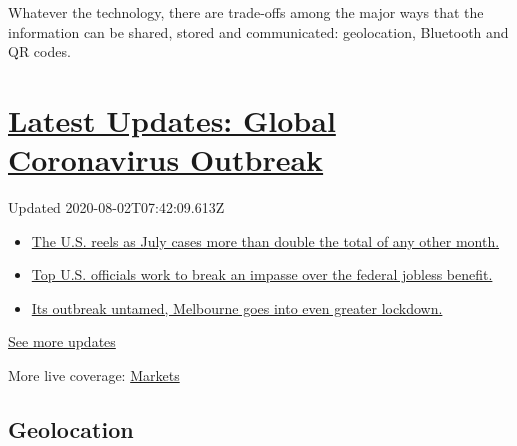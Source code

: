 Whatever the technology, there are trade-offs among the major ways that
the information can be shared, stored and communicated: geolocation,
Bluetooth and QR codes.

\hypertarget{latest-updates-global-coronavirus-outbreak}{%
\section{\texorpdfstring{\href{https://www.nytimes3xbfgragh.onion/2020/08/01/world/coronavirus-covid-19.html?action=click\&pgtype=Article\&state=default\&region=MAIN_CONTENT_1\&context=storylines_live_updates}{Latest
Updates: Global Coronavirus
Outbreak}}{Latest Updates: Global Coronavirus Outbreak}}\label{latest-updates-global-coronavirus-outbreak}}

Updated 2020-08-02T07:42:09.613Z

\begin{itemize}
\tightlist
\item
  \href{https://www.nytimes3xbfgragh.onion/2020/08/01/world/coronavirus-covid-19.html?action=click\&pgtype=Article\&state=default\&region=MAIN_CONTENT_1\&context=storylines_live_updates\#link-34047410}{The
  U.S. reels as July cases more than double the total of any other
  month.}
\item
  \href{https://www.nytimes3xbfgragh.onion/2020/08/01/world/coronavirus-covid-19.html?action=click\&pgtype=Article\&state=default\&region=MAIN_CONTENT_1\&context=storylines_live_updates\#link-780ec966}{Top
  U.S. officials work to break an impasse over the federal jobless
  benefit.}
\item
  \href{https://www.nytimes3xbfgragh.onion/2020/08/01/world/coronavirus-covid-19.html?action=click\&pgtype=Article\&state=default\&region=MAIN_CONTENT_1\&context=storylines_live_updates\#link-2bc8948}{Its
  outbreak untamed, Melbourne goes into even greater lockdown.}
\end{itemize}

\href{https://www.nytimes3xbfgragh.onion/2020/08/01/world/coronavirus-covid-19.html?action=click\&pgtype=Article\&state=default\&region=MAIN_CONTENT_1\&context=storylines_live_updates}{See
more updates}

More live coverage:
\href{https://www.nytimes3xbfgragh.onion/live/2020/07/31/business/stock-market-today-coronavirus?action=click\&pgtype=Article\&state=default\&region=MAIN_CONTENT_1\&context=storylines_live_updates}{Markets}

\hypertarget{geolocation}{%
\subsection{Geolocation}\label{geolocation}}

